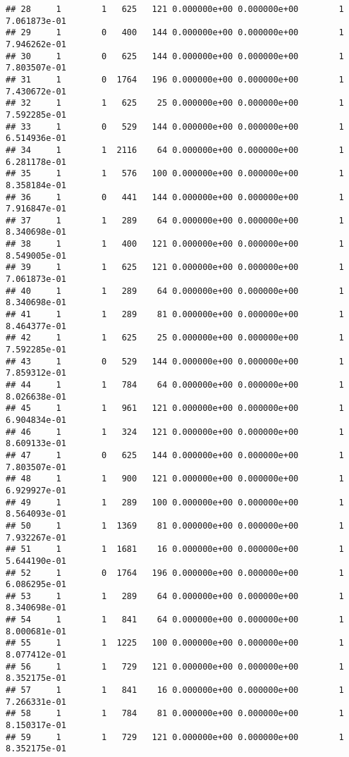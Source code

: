 \documentclass[
]{article}
\begin{document}
\begin{enumerate}
\begin{verbatim}
## 28     1        1   625   121 0.000000e+00 0.000000e+00        1  7.061873e-01
## 29     1        0   400   144 0.000000e+00 0.000000e+00        1  7.946262e-01
## 30     1        0   625   144 0.000000e+00 0.000000e+00        1  7.803507e-01
## 31     1        0  1764   196 0.000000e+00 0.000000e+00        1  7.430672e-01
## 32     1        1   625    25 0.000000e+00 0.000000e+00        1  7.592285e-01
## 33     1        0   529   144 0.000000e+00 0.000000e+00        1  6.514936e-01
## 34     1        1  2116    64 0.000000e+00 0.000000e+00        1  6.281178e-01
## 35     1        1   576   100 0.000000e+00 0.000000e+00        1  8.358184e-01
## 36     1        0   441   144 0.000000e+00 0.000000e+00        1  7.916847e-01
## 37     1        1   289    64 0.000000e+00 0.000000e+00        1  8.340698e-01
## 38     1        1   400   121 0.000000e+00 0.000000e+00        1  8.549005e-01
## 39     1        1   625   121 0.000000e+00 0.000000e+00        1  7.061873e-01
## 40     1        1   289    64 0.000000e+00 0.000000e+00        1  8.340698e-01
## 41     1        1   289    81 0.000000e+00 0.000000e+00        1  8.464377e-01
## 42     1        1   625    25 0.000000e+00 0.000000e+00        1  7.592285e-01
## 43     1        0   529   144 0.000000e+00 0.000000e+00        1  7.859312e-01
## 44     1        1   784    64 0.000000e+00 0.000000e+00        1  8.026638e-01
## 45     1        1   961   121 0.000000e+00 0.000000e+00        1  6.904834e-01
## 46     1        1   324   121 0.000000e+00 0.000000e+00        1  8.609133e-01
## 47     1        0   625   144 0.000000e+00 0.000000e+00        1  7.803507e-01
## 48     1        1   900   121 0.000000e+00 0.000000e+00        1  6.929927e-01
## 49     1        1   289   100 0.000000e+00 0.000000e+00        1  8.564093e-01
## 50     1        1  1369    81 0.000000e+00 0.000000e+00        1  7.932267e-01
## 51     1        1  1681    16 0.000000e+00 0.000000e+00        1  5.644190e-01
## 52     1        0  1764   196 0.000000e+00 0.000000e+00        1  6.086295e-01
## 53     1        1   289    64 0.000000e+00 0.000000e+00        1  8.340698e-01
## 54     1        1   841    64 0.000000e+00 0.000000e+00        1  8.000681e-01
## 55     1        1  1225   100 0.000000e+00 0.000000e+00        1  8.077412e-01
## 56     1        1   729   121 0.000000e+00 0.000000e+00        1  8.352175e-01
## 57     1        1   841    16 0.000000e+00 0.000000e+00        1  7.266331e-01
## 58     1        1   784    81 0.000000e+00 0.000000e+00        1  8.150317e-01
## 59     1        1   729   121 0.000000e+00 0.000000e+00        1  8.352175e-01

\end{verbatim}
\end{enumerate}
\end{document}
